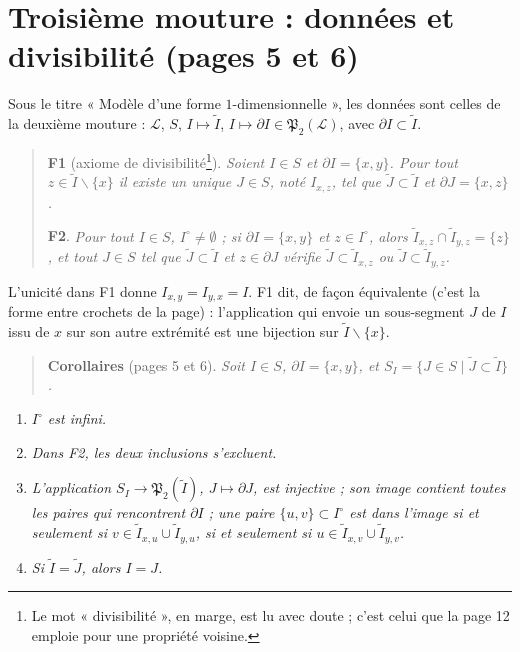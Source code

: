 \documentclass[11pt,a4paper]{article}
\begin{document}
\section*{Troisième mouture : données et divisibilité (pages 5 et 6)}

Sous le titre « Modèle d'une forme $1$-dimensionnelle », les données sont
celles de la deuxième mouture : $\mathcal{L}$, $S$, $I \mapsto \widetilde{I}$,
$I \mapsto \partial I \in \mathfrak{P}_{2}(\mathcal{L})$, avec $\partial I
\subset \widetilde{I}$.

\begin{quote}
\textbf{F1} (axiome de divisibilité\footnote{Le mot « divisibilité », en
marge, est lu avec doute ; c'est celui que la page 12 emploie pour une
propriété voisine.}). \emph{Soient $I \in S$ et $\partial I = \{x,y\}$. Pour
tout $z \in \widetilde{I} \smallsetminus \{x\}$ il existe un unique $J \in S$,
noté $I_{x,z}$, tel que $\widetilde{J} \subset \widetilde{I}$ et $\partial J =
\{x,z\}$.}

\textbf{F2}. \emph{Pour tout $I \in S$, $I^{\circ} \neq \emptyset$ ; si
$\partial I = \{x,y\}$ et $z \in I^{\circ}$, alors $\widetilde{I}_{x,z} \cap \widetilde{I}_{y,z} = \{z\}$, et
tout $J \in S$ tel que $\widetilde{J} \subset \widetilde{I}$ et $z \in
\partial J$ vérifie $\widetilde{J} \subset \widetilde{I}_{x,z}$ ou
$\widetilde{J} \subset \widetilde{I}_{y,z}$.}
\end{quote}

L'unicité dans F1 donne $I_{x,y} = I_{y,x} = I$. F1 dit, de façon équivalente
(c'est la forme entre crochets de la page) : l'application qui envoie un
sous-segment $J$ de $I$ issu de $x$ sur son autre extrémité est une bijection
sur $\widetilde{I} \smallsetminus \{x\}$.

\begin{quote}
\textbf{Corollaires} (pages 5 et 6). \emph{Soit $I \in S$, $\partial I =
\{x,y\}$, et $S_{I} = \{J \in S \mid \widetilde{J} \subset \widetilde{I}\}$.}
\end{quote}

\begin{enumerate}
\item[1.] \emph{$I^{\circ}$ est infini.}
\item[2.] \emph{Dans F2, les deux inclusions s'excluent.}
\item[3.] \emph{L'application $S_{I} \to \mathfrak{P}_{2}(\widetilde{I})$, $J
\mapsto \partial J$, est injective ; son image contient toutes les paires qui
rencontrent $\partial I$ ; une paire $\{u,v\} \subset I^{\circ}$ est dans
l'image si et seulement si $v \in \widetilde{I}_{x,u} \cup
\widetilde{I}_{y,u}$, si et seulement si $u \in \widetilde{I}_{x,v} \cup
\widetilde{I}_{y,v}$.}
\item[4.] \emph{Si $\widetilde{I} = \widetilde{J}$, alors $I = J$.}
\end{enumerate}
\end{document}
